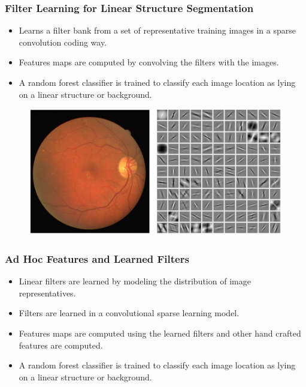 \documentclass{beamer}
\begin{document}
	
	\begin{frame}
		\frametitle{Filter Learning for Linear Structure Segmentation}

			\begin{itemize}
				\item Learns a filter bank from a set of representative training images in a sparse convolution coding way.
				\item Features maps are computed by convolving the filters with the images.
				\item A random forest classifier is trained to classify each image location as lying on a linear structure or background.
			\end{itemize}			
	\end{frame}
	\begin{frame}
			\begin{figure}
				\includegraphics[width=0.6\linewidth]{methods/dl.png}
			\end{figure}			
	
	\end{frame}
	
		
		
		

	\begin{frame}
		\frametitle{Ad Hoc Features and Learned Filters}
			\begin{itemize}
				\item Linear filters are learned by modeling the distribution of image representatives.
				\item Filters are learned in a convolutional sparse learning model.
				\item Features maps are computed using the learned filters and other hand crafted features  are computed.
				\item A random forest classifier is trained to classify each image location as lying on a linear structure or background.
			\end{itemize}			

	\end{frame}
	
\end{document}
